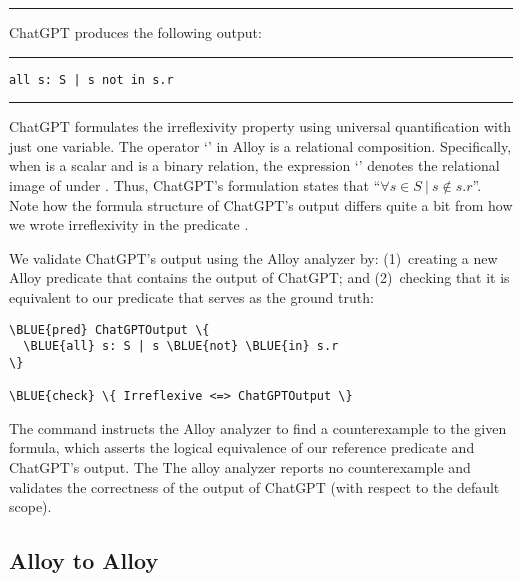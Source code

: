 \noindent\hfil\rule{0.99\textwidth}{1pt}\hfil

\noindent{}ChatGPT produces the following output:

\noindent\hfil\rule{0.99\textwidth}{1pt}\hfil

\vspace*{-2ex}
\begin{CodeOut}
\begin{verbatim}
all s: S | s not in s.r
\end{verbatim}
\end{CodeOut}

\vspace*{-3ex}

\noindent\hfil\rule{0.99\textwidth}{1pt}\hfil

ChatGPT formulates the irreflexivity property using universal
quantification with just one variable.  The operator `' in
Alloy is a relational composition.  Specifically, when  is a
scalar and  is a binary relation, the expression
`' denotes the relational image of  under
.  Thus, ChatGPT's formulation states that ``$\forall s\in S
~|~ s \not\in s.r$''.  Note how the formula structure of ChatGPT's
output differs quite a bit from how we wrote irreflexivity in the
predicate .

We validate ChatGPT's output using the Alloy analyzer by: (1)~creating
a new Alloy predicate  that contains the output
of ChatGPT; and (2)~checking that it is equivalent to our predicate
 that serves as the ground truth:

\begin{CodeOut}
\begin{Verbatim}
\BLUE{pred} ChatGPTOutput \{
  \BLUE{all} s: S | s \BLUE{not} \BLUE{in} s.r
\}

\BLUE{check} \{ Irreflexive <=> ChatGPTOutput \}
\end{Verbatim}
\end{CodeOut}
The  command instructs the Alloy analyzer to find a
counterexample to the given formula, which asserts the logical
equivalence of our reference predicate and ChatGPT's output.  The
The alloy analyzer reports no counterexample and validates the correctness
of the output of ChatGPT (with respect to the default scope).

\subsection{Alloy to Alloy}
\vspace*{-1ex}

